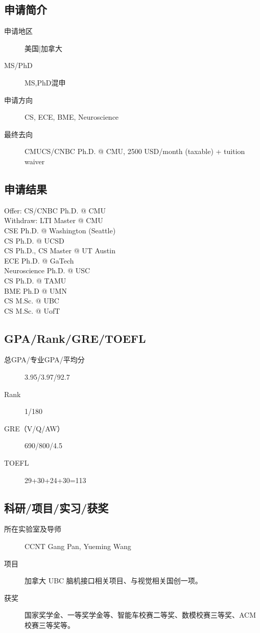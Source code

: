 \documentclass[11pt,fleqn,openany]{book} %
\begin{document}
\noindent\begin{minipage}[t]{0.45\textwidth}
\subsection*{申请简介}
\begin{description}
\item[申请地区] 美国|加拿大
\item[MS/PhD] MS,PhD混申
\item[申请方向] CS, ECE, BME, Neuroscience
\item[最终去向] CMUCS/CNBC Ph.D. @ CMU, 2500 USD/month (taxable) + tuition waiver
\end{description}
\end{minipage}
\hfill
\begin{minipage}[t]{0.45\textwidth}
\subsection*{申请结果}
\noindent Offer: CS/CNBC Ph.D. @ CMU\\
Withdraw: LTI Master @ CMU\\
CSE Ph.D. @ Washington (Seattle)\\
CS Ph.D. @ UCSD\\
CS Ph.D., CS Master @ UT Austin\\
ECE Ph.D. @ GaTech\\
Neuroscience Ph.D. @ USC\\
CS Ph.D. @ TAMU\\
BME Ph.D @ UMN\\
CS M.Sc. @ UBC\\
CS M.Sc. @ UofT
\end{minipage}
\subsection*{GPA/Rank/GRE/TOEFL}
\begin{description}
\item[总GPA/专业GPA/平均分] 3.95/3.97/92.7
\item[Rank] 1/180
\item[GRE（V/Q/AW）] 690/800/4.5
\item[TOEFL] 29+30+24+30=113
\end{description}

\subsection*{科研/项目/实习/获奖}
\begin{description}
\item[所在实验室及导师] CCNT Gang Pan, Yueming Wang
\item[项目] 加拿大 UBC 脑机接口相关项目、与视觉相关国创一项。
\item[获奖] 国家奖学金、一等奖学金等、智能车校赛二等奖、数模校赛三等奖、ACM 校赛三等奖等。
\end{description}
\end{document}
